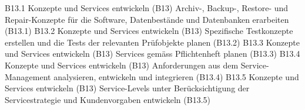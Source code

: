 \templateCard
  {B13.1}
  {Konzepte und Services entwickeln (B13)}
  {Archiv-, Backup-, Restore- und Repair-Konzepte für die Software, Datenbestände und Datenbanken erarbeiten (B13.1)}
\templateCard
  {B13.2}
  {Konzepte und Services entwickeln (B13)}
  {Spezifische Testkonzepte erstellen und die Tests der relevanten Prüfobjekte planen (B13.2)}
\templateCard
  {B13.3}
  {Konzepte und Services entwickeln (B13)}
  {Services gemäss Pflichtenheft planen (B13.3)}
\templateCard
  {B13.4}
  {Konzepte und Services entwickeln (B13)}
  {Anforderungen aus dem Service-Management analysieren, entwickeln und integrieren (B13.4)}
\templateCard
  {B13.5}
  {Konzepte und Services entwickeln (B13)}
  {Service-Levels unter Berücksichtigung der Servicestrategie und Kundenvorgaben entwickeln (B13.5)}
